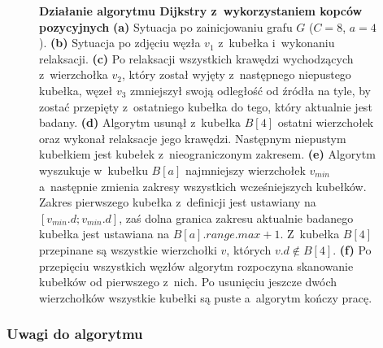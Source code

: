 \begin{figure}[!htbp]
\begin{subfigure}[b]{0.3\textwidth}
		\caption{}
	\end{subfigure}
	\caption{\textbf{Działanie algorytmu Dijkstry z~wykorzystaniem kopców pozycyjnych} \textbf{(a)} Sytuacja po zainicjowaniu grafu $G$ ($C=8$, $a=4$). \textbf{(b)} Sytuacja po zdjęciu węzła $v_{1}$ z~kubełka i~wykonaniu relaksacji. \textbf{(c)} Po relaksacji wszystkich krawędzi wychodzących z~wierzchołka $v_{2}$, który został wyjęty z~następnego niepustego kubełka, węzeł $v_{3}$ zmniejszył swoją odległość od źródła na tyle, by zostać przepięty z~ostatniego kubełka do tego, który aktualnie jest badany. \textbf{(d)} Algorytm usunął z~kubełka $B \left[ 4 \right]$ ostatni wierzchołek oraz wykonał relaksacje jego krawędzi. Następnym niepustym kubełkiem jest kubełek z~nieograniczonym zakresem. \textbf{(e)} Algorytm wyszukuje w~kubełku $B \left[ a \right]$ najmniejszy wierzchołek $v_{min}$ a~następnie zmienia zakresy wszystkich wcześniejszych kubełków. Zakres pierwszego kubełka z~definicji jest ustawiany na $\left[ v_{min}.d ; v_{min}.d \right]$, zaś dolna granica zakresu aktualnie badanego kubełka jest ustawiana na $B \left[ a \right].range.max + 1$. Z~kubełka $B \left[ 4 \right]$ przepinane są wszystkie wierzchołki $v$, których $v.d \notin B \left[ 4 \right]$. \textbf{(f)} Po przepięciu wszystkich węzłów algorytm rozpoczyna skanowanie kubełków od pierwszego z~nich. Po usunięciu jeszcze dwóch wierzchołków wszystkie kubełki są puste a~algorytm kończy pracę. } \label{fig:exampleRadixHeapC}
\end{figure}

\subsubsection{Uwagi do algorytmu}


